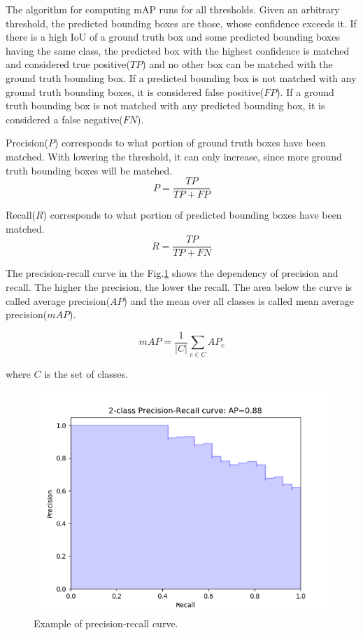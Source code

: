 \documentclass[a4paper,12pt,titlepage, twoside]{article}
\numberwithin{figure}{section}
\begin{document}
The algorithm for computing mAP runs for all thresholds. Given an arbitrary threshold, the predicted bounding boxes are those, whose confidence exceeds it. If there is a high IoU of a ground truth box and some predicted bounding boxes having the same class, the predicted box with the highest confidence is matched and considered true positive($TP$) and no other box can be matched with the ground truth bounding box. If a predicted bounding box is not matched with any ground truth bounding boxes, it is considered false positive($FP$). If a ground truth bounding box is not matched with any predicted bounding box, it is considered a false negative($FN$).

Precision($P$) corresponds to what portion of ground truth boxes have been matched. With lowering the threshold, it can only increase, since more ground truth bounding boxes will be matched.
\begin{equation}
P = \frac{TP}{TP + FP}
\end{equation}

Recall($R$) corresponds to what portion of predicted bounding boxes have been matched. 
\begin{equation}
R = \frac{TP}{TP + FN}
\end{equation}

The precision-recall curve in the Fig.\ref{fig:precision-recall} shows the dependency of precision and recall. The higher the precision, the lower the recall. The area below the curve is called average precision($AP$) and the mean over all classes is called mean average precision($mAP$).

\begin{equation}
mAP = \frac{1}{|C|} \sum_{c \in C} AP_c
\end{equation}

where $C$ is the set of classes.

\begin{figure}[H]
\centering
\includegraphics[width=1\linewidth]{fig/precision-recall.png}
\caption{Example of precision-recall curve.}
\label{fig:precision-recall}
\end{figure}
\end{document}
